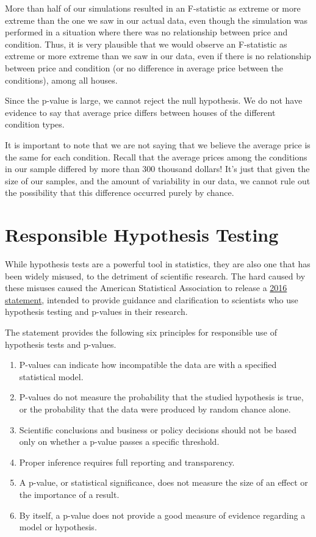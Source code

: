 \documentclass[
  letterpaper,
  DIV=11,
  numbers=noendperiod]{scrreprt}
\begin{document}
More than half of our simulations resulted in an F-statistic as extreme
or more extreme than the one we saw in our actual data, even though the
simulation was performed in a situation where there was no relationship
between price and condition. Thus, it is very plausible that we would
observe an F-statistic as extreme or more extreme than we saw in our
data, even if there is no relationship between price and condition (or
no difference in average price between the conditions), among all
houses.

Since the p-value is large, we cannot reject the null hypothesis. We do
not have evidence to say that average price differs between houses of
the different condition types.

It is important to note that we are not saying that we believe the
average price is the same for each condition. Recall that the average
prices among the conditions in our sample differed by more than 300
thousand dollars! It's just that given the size of our samples, and the
amount of variability in our data, we cannot rule out the possibility
that this difference occurred purely by chance.

\section{Responsible Hypothesis
Testing}\label{responsible-hypothesis-testing}

While hypothesis tests are a powerful tool in statistics, they are also
one that has been widely misused, to the detriment of scientific
research. The hard caused by these misuses caused the American
Statistical Association to release a
\href{https://www.amstat.org/asa/files/pdfs/p-valuestatement.pdf}{2016
statement}, intended to provide guidance and clarification to scientists
who use hypothesis testing and p-values in their research.

The statement provides the following six principles for responsible use
of hypothesis tests and p-values.

\begin{enumerate}
\def\labelenumi{\arabic{enumi}.}
\item
  P-values can indicate how incompatible the data are with a specified
  statistical model.
\item
  P-values do not measure the probability that the studied hypothesis is
  true, or the probability that the data were produced by random chance
  alone.
\item
  Scientific conclusions and business or policy decisions should not be
  based only on whether a p-value passes a specific threshold.
\item
  Proper inference requires full reporting and transparency.
\item
  A p-value, or statistical significance, does not measure the size of
  an effect or the importance of a result.
\item
  By itself, a p-value does not provide a good measure of evidence
  regarding a model or hypothesis.
\end{enumerate}
\end{document}
